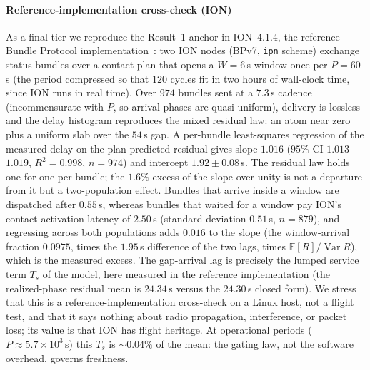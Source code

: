 \documentclass[twocolumn,3p,times,procedia]{elsarticle}
\theoremstyle{plain}
\theoremstyle{remark}
\newcommand{\E}{\mathbb{E}}
\begin{document}
\paragraph*{Reference-implementation cross-check (ION)}
As a final tier we reproduce the Result~1 anchor in ION~4.1.4, the
reference Bundle Protocol implementation~\cite{burleigh2007ion}: two ION
nodes (BPv7, \texttt{ipn} scheme) exchange status bundles over a
contact plan that opens a $W{=}6$\,s window once per $P{=}60$\,s (the
period compressed so that $120$ cycles fit in two hours of wall-clock
time, since ION runs in real time). Over $974$ bundles sent at a
$7.3$\,s cadence (incommensurate with $P$, so arrival phases are
quasi-uniform), delivery is lossless and the delay histogram reproduces
the mixed residual law: an atom near zero plus a uniform slab over the
$54$\,s gap. A per-bundle least-squares regression of the measured
delay on the plan-predicted residual gives slope $1.016$ ($95\%$ CI
$1.013$--$1.019$, $R^2{=}0.998$, $n{=}974$) and intercept
$1.92\pm0.08$\,s. The residual law holds one-for-one per bundle; the
$1.6\%$ excess of the slope over unity is not a departure from it but a
two-population effect. Bundles that arrive inside a window are
dispatched after $0.55$\,s, whereas bundles that waited for a window
pay ION's contact-activation latency of $2.50$\,s (standard deviation
$0.51$\,s, $n{=}879$), and regressing across both populations adds
$0.016$ to the slope (the window-arrival fraction $0.0975$, times the
$1.95$\,s difference of the two lags, times
$\E[R]/\operatorname{Var}R$), which is the measured excess. The
gap-arrival lag is precisely the lumped service
term $T_s$ of the model, here measured in the reference implementation
(the realized-phase residual mean is $24.34$\,s versus the $24.30$\,s
closed form). We stress that this is a reference-implementation cross-check on
a Linux host, not a flight test, and that it says nothing about radio
propagation, interference, or packet loss; its value is that ION has
flight heritage. At operational periods
($P\approx5.7\times10^3$\,s) this $T_s$ is ${\sim}0.04\%$ of the mean:
the gating law, not the software overhead, governs freshness.
\end{document}
